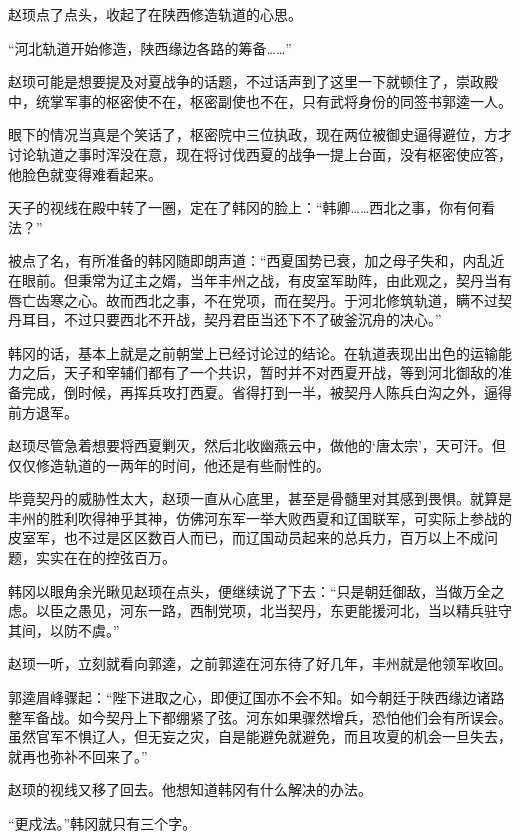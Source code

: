 赵顼点了点头，收起了在陕西修造轨道的心思。

“河北轨道开始修造，陕西缘边各路的筹备……”

赵顼可能是想要提及对夏战争的话题，不过话声到了这里一下就顿住了，崇政殿中，统掌军事的枢密使不在，枢密副使也不在，只有武将身份的同签书郭逵一人。

眼下的情况当真是个笑话了，枢密院中三位执政，现在两位被御史逼得避位，方才讨论轨道之事时浑没在意，现在将讨伐西夏的战争一提上台面，没有枢密使应答，他脸色就变得难看起来。

天子的视线在殿中转了一圈，定在了韩冈的脸上：“韩卿……西北之事，你有何看法？”

被点了名，有所准备的韩冈随即朗声道：“西夏国势已衰，加之母子失和，内乱近在眼前。但秉常为辽主之婿，当年丰州之战，有皮室军助阵，由此观之，契丹当有唇亡齿寒之心。故而西北之事，不在党项，而在契丹。于河北修筑轨道，瞒不过契丹耳目，不过只要西北不开战，契丹君臣当还下不了破釜沉舟的决心。”

韩冈的话，基本上就是之前朝堂上已经讨论过的结论。在轨道表现出出色的运输能力之后，天子和宰辅们都有了一个共识，暂时并不对西夏开战，等到河北御敌的准备完成，倒时候，再挥兵攻打西夏。省得打到一半，被契丹人陈兵白沟之外，逼得前方退军。

赵顼尽管急着想要将西夏剿灭，然后北收幽燕云中，做他的‘唐太宗’，天可汗。但仅仅修造轨道的一两年的时间，他还是有些耐性的。

毕竟契丹的威胁性太大，赵顼一直从心底里，甚至是骨髓里对其感到畏惧。就算是丰州的胜利吹得神乎其神，仿佛河东军一举大败西夏和辽国联军，可实际上参战的皮室军，也不过是区区数百人而已，而辽国动员起来的总兵力，百万以上不成问题，实实在在的控弦百万。

韩冈以眼角余光瞅见赵顼在点头，便继续说了下去：“只是朝廷御敌，当做万全之虑。以臣之愚见，河东一路，西制党项，北当契丹，东更能援河北，当以精兵驻守其间，以防不虞。”

赵顼一听，立刻就看向郭逵，之前郭逵在河东待了好几年，丰州就是他领军收回。

郭逵眉峰骤起：“陛下进取之心，即便辽国亦不会不知。如今朝廷于陕西缘边诸路整军备战。如今契丹上下都绷紧了弦。河东如果骤然增兵，恐怕他们会有所误会。虽然官军不惧辽人，但无妄之灾，自是能避免就避免，而且攻夏的机会一旦失去，就再也弥补不回来了。”

赵顼的视线又移了回去。他想知道韩冈有什么解决的办法。

“更戍法。”韩冈就只有三个字。

